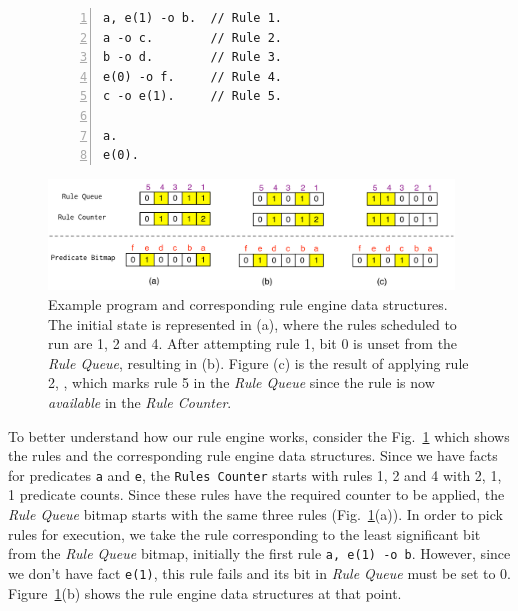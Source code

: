 \begin{figure}[t]
   \begin{center}
\begin{BVerbatim}[numbers=left,fontsize=\codesize]
a, e(1) -o b.  // Rule 1.
a -o c.        // Rule 2.
b -o d.        // Rule 3.
e(0) -o f.     // Rule 4.
c -o e(1).     // Rule 5.

a.
e(0).
\end{BVerbatim}
\end{center}
\vspace{5mm}
   \includegraphics[width=0.96\textwidth]{figures/implementation/rule_queue.pdf}

   \caption{Example program and corresponding rule engine data structures. The
      initial state is represented in (a), where the rules scheduled to run are
      1, 2 and 4. After attempting rule 1, bit 0 is unset from the \emph{Rule
      Queue}, resulting in (b). Figure (c) is the result of applying rule 2,
      , which marks rule 5 in the \emph{Rule Queue} since the rule
      is now \emph{available} in the \emph{Rule Counter}.}

   \label{fig:implementation:rule_engine}
\end{figure}

To better understand how our rule engine works, consider the
Fig.~\ref{fig:implementation:rule_engine} which shows the rules and the
corresponding rule engine data structures. Since we have facts for predicates
\texttt{a} and \texttt{e}, the \texttt{Rules Counter} starts with rules 1, 2 and
4 with 2, 1, 1 predicate counts. Since these rules have the required counter to
be applied, the \emph{Rule Queue} bitmap starts with the same three rules
(Fig.~\ref{fig:implementation:rule_engine}(a)). In order to pick rules for
execution, we take the rule corresponding to the least significant bit from the
\emph{Rule Queue} bitmap, initially the first rule \texttt{a, e(1) -o b}.
However, since we don't have fact \texttt{e(1)}, this rule fails and its bit in
\emph{Rule Queue} must be set to 0.
Figure~\ref{fig:implementation:rule_engine}(b) shows the rule engine data
structures at that point.

